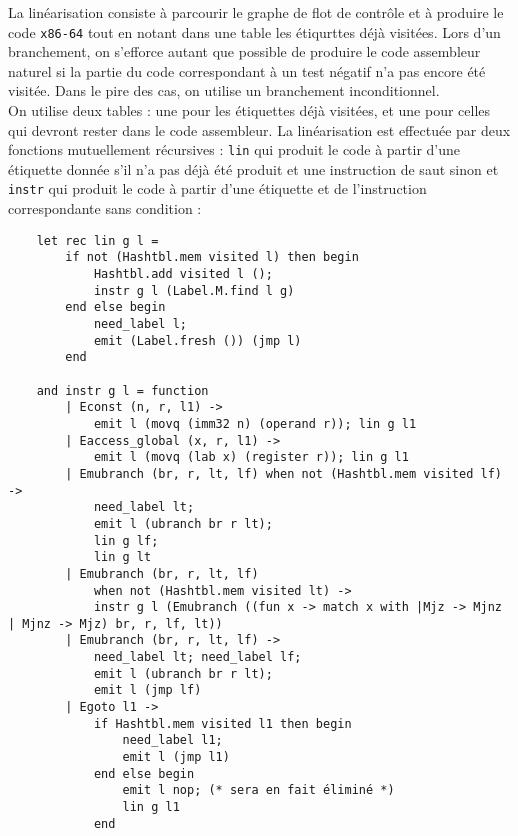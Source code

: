 \documentclass{cours}
\begin{document}
La linéarisation consiste à parcourir le graphe de flot de contrôle et à produire le code \texttt{x86-64} tout en notant dans une table les étiqurttes déjà visitées. Lors d'un branchement, on s'efforce autant que possible de produire le code assembleur naturel si la partie du code correspondant à un test négatif n'a pas encore été visitée. Dans le pire des cas, on utilise un branchement inconditionnel. \\
On utilise deux tables : une pour les étiquettes déjà visitées, et une pour celles qui devront rester dans le code assembleur. La linéarisation est effectuée par deux fonctions mutuellement récursives : \texttt{lin} qui produit le code à partir d'une étiquette donnée s'il n'a pas déjà été produit et une instruction de saut sinon et \texttt{instr} qui produit le code à partir d'une étiquette et de l'instruction correspondante sans condition :
\begin{verbatim}
    let rec lin g l =
        if not (Hashtbl.mem visited l) then begin
            Hashtbl.add visited l ();
            instr g l (Label.M.find l g)
        end else begin
            need_label l;
            emit (Label.fresh ()) (jmp l)
        end

    and instr g l = function
        | Econst (n, r, l1) ->
            emit l (movq (imm32 n) (operand r)); lin g l1
        | Eaccess_global (x, r, l1) ->
            emit l (movq (lab x) (register r)); lin g l1
        | Emubranch (br, r, lt, lf) when not (Hashtbl.mem visited lf) ->
            need_label lt;
            emit l (ubranch br r lt);
            lin g lf;
            lin g lt
        | Emubranch (br, r, lt, lf)
            when not (Hashtbl.mem visited lt) ->
            instr g l (Emubranch ((fun x -> match x with |Mjz -> Mjnz | Mjnz -> Mjz) br, r, lf, lt))
        | Emubranch (br, r, lt, lf) ->
            need_label lt; need_label lf;
            emit l (ubranch br r lt);
            emit l (jmp lf)
        | Egoto l1 ->
            if Hashtbl.mem visited l1 then begin
                need_label l1;
                emit l (jmp l1)
            end else begin
                emit l nop; (* sera en fait éliminé *)
                lin g l1
            end
\end{verbatim}
\end{document}
